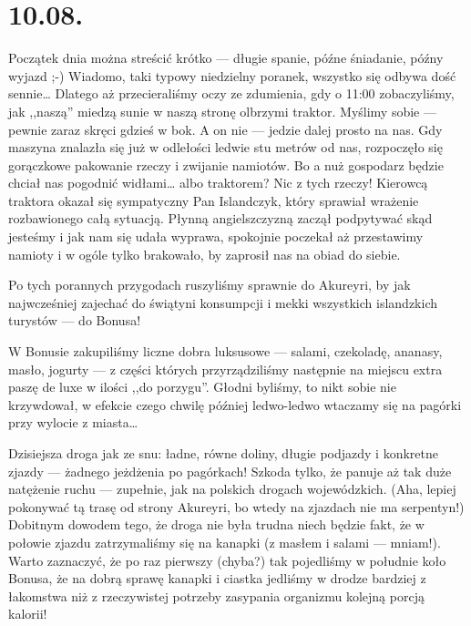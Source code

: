 \chapter*{10.08.}

Początek dnia można streścić krótko --- długie spanie, późne śniadanie, późny wyjazd ;-) Wiadomo, taki typowy niedzielny poranek, wszystko się odbywa dość sennie… Dlatego aż przecieraliśmy oczy ze zdumienia, gdy o 11:00 zobaczyliśmy, jak ,,naszą'' miedzą sunie w naszą stronę olbrzymi traktor. Myślimy sobie --- pewnie zaraz skręci gdzieś w bok. A on nie --- jedzie dalej prosto na nas. Gdy maszyna znalazła się już w odlełości ledwie stu metrów od nas, rozpoczęło się gorączkowe pakowanie rzeczy i zwijanie namiotów. Bo a nuż gospodarz będzie chciał nas pogodnić widłami… albo traktorem? Nic z tych rzeczy! Kierowcą traktora okazał się sympatyczny Pan Islandczyk, który sprawiał wrażenie rozbawionego całą sytuacją. Płynną angielszczyzną zaczął podpytywać skąd jesteśmy i jak nam się udała wyprawa, spokojnie poczekał aż przestawimy namioty i w ogóle tylko brakowało, by zaprosił nas na obiad do siebie.

Po tych porannych przygodach ruszyliśmy sprawnie do Akureyri, by jak najwcześniej zajechać do świątyni konsumpcji i mekki wszystkich islandzkich turystów --- do Bonusa!


W Bonusie zakupiliśmy liczne dobra luksusowe --- salami, czekoladę, ananasy, masło, jogurty --- z części których przyrządziliśmy następnie na miejscu extra paszę de luxe w ilości ,,do porzygu''. Głodni byliśmy, to nikt sobie nie krzywdował, w efekcie czego chwilę później ledwo-ledwo wtaczamy się na pagórki przy wylocie z miasta…


Dzisiejsza droga jak ze snu: ładne, równe doliny, długie podjazdy i konkretne zjazdy --- żadnego jeżdżenia po pagórkach! Szkoda tylko, że panuje aż tak duże natężenie ruchu --- zupełnie, jak na polskich drogach wojewódzkich. (Aha, lepiej pokonywać tą trasę od strony Akureyri, bo wtedy na zjazdach nie ma serpentyn!) Dobitnym dowodem tego, że droga nie była trudna niech będzie fakt, że w połowie zjazdu zatrzymaliśmy się na kanapki (z masłem i salami --- mniam!). Warto zaznaczyć, że po raz pierwszy (chyba?) tak pojedliśmy w południe koło Bonusa, że na dobrą sprawę kanapki i ciastka jedliśmy w drodze bardziej z łakomstwa niż z rzeczywistej potrzeby zasypania organizmu kolejną porcją kalorii!

